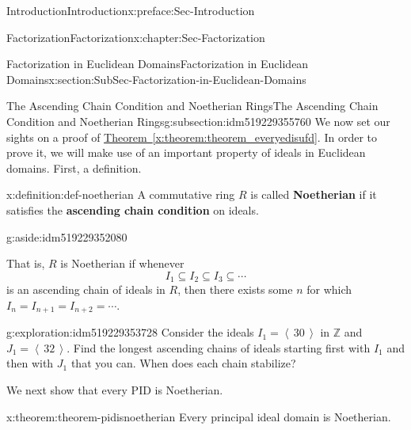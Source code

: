 \documentclass[oneside,10pt,]{book}
\newcommand{\xreffont}{\relax}
\newcommand{\terminology}[1]{\textbf{#1}}
\numberwithin{equation}{section}
\newcommand{\ideal}[1]{\left\langle\, #1 \,\right\rangle}
\def\Z{{\mathbb Z}}
\begin{document}
\begin{preface}{Introduction}{}{Introduction}{}{}{x:preface:Sec-Introduction}
\begin{chapterptx}{Factorization}{}{Factorization}{}{}{x:chapter:Sec-Factorization}
\begin{sectionptx}{Factorization in Euclidean Domains}{}{Factorization in Euclidean Domains}{}{}{x:section:SubSec-Factorization-in-Euclidean-Domains}
\typeout{************************************************}
%
\begin{subsectionptx}{The Ascending Chain Condition and Noetherian Rings}{}{The Ascending Chain Condition and Noetherian Rings}{}{}{g:subsection:idm519229355760}
We now set our sights on a proof of \hyperref[x:theorem:theorem_everyedisufd]{Theorem~{\xreffont\ref{x:theorem:theorem_everyedisufd}}}. In order to prove it, we will make use of an important property of ideals in Euclidean domains. First, a definition.%
\begin{definition}{}{x:definition:def-noetherian}%
A commutative ring \(R\) is called \terminology{Noetherian} if it satisfies the \terminology{ascending chain condition} on ideals. \begin{aside}{}{g:aside:idm519229352080}%
\end{aside}
 That is, \(R\) is Noetherian if whenever%
\begin{equation*}
I_1 \subseteq I_2\subseteq I_3\subseteq \cdots
\end{equation*}
is an ascending chain of ideals in \(R\), then there exists some \(n\) for which \(I_n = I_{n+1} = I_{n+2} = \cdots\).%
\end{definition}
\begin{exploration}{}{g:exploration:idm519229353728}%
Consider the ideals \(I_1 = \ideal{30}\) in \(\Z\) and \(J_1 = \ideal{32}\). Find the longest ascending chains of ideals starting first with \(I_1\) and then with \(J_1\) that you can. When does each chain stabilize?%
\end{exploration}
We next show that every PID is Noetherian.%
\begin{theorem}{}{}{x:theorem:theorem-pidisnoetherian}%
Every principal ideal domain is Noetherian.%



\end{theorem}
\end{subsectionptx}
\end{sectionptx}
\end{chapterptx}
\end{preface}
\end{document}
